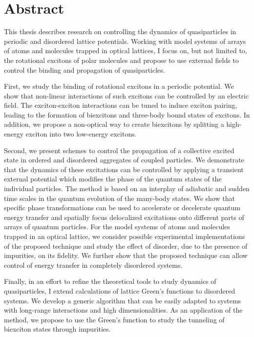
\chapter{Abstract}

This thesis describes research on controlling the dynamics of quasiparticles in 
 periodic and disordered lattice potentials. Working with model systems of arrays of atoms and molecules trapped in  optical lattices, 
I focus on, but not limited to, the rotational excitons of polar molecules and propose to use external fields to 
control the binding and propagation of quasiparticles. 

First, we study the binding of  rotational excitons in a periodic potential. We show that non-linear interactions of such excitons can
 be controlled by an electric field. The exciton-exciton interactions can be tuned
 to induce exciton pairing, leading to the formation of biexcitons and three-body bound states of excitons. In addition, we propose a non-optical way to create biexcitons by splitting a high-energy exciton into two 
low-energy excitons. 

Second, we present schemes to control the propagation of a collective
 excited state in ordered and disordered aggregates of coupled particles. We demonstrate that the dynamics of these excitations can be controlled by
 applying a transient external potential which modifies the phase of the quantum
 states of the individual particles. The method is based on an interplay of adiabatic
 and sudden time scales in the quantum evolution of the many-body states. We show
 that specific phase transformations can be used to accelerate or decelerate quantum
 energy transfer and spatially focus delocalized excitations onto different parts of
arrays of quantum particles. For the model systems of atoms and molecules trapped in an optical lattice, we consider possible experimental implementations
 of the proposed technique and study the effect of disorder, due to the presence of
 impurities, on its fidelity. We further show that the proposed technique can allow
 control of energy transfer in completely disordered systems.
 

Finally, in an effort to refine the theoretical tools to study dynamics of quasiparticles, I extend calculations of lattice 
Green's functions to disordered systems. We develop a generic algorithm that can 
be easily adapted to systems with long-range interactions and high dimensionalities. As an application of the method, we propose 
to use the Green's function to study the tunneling of biexciton states through
 impurities.


